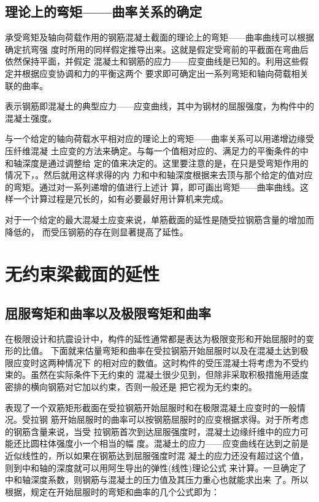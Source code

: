 \documentclass[12pt,a4paper]{book}
\begin{document}
\subsection{理论上的弯矩——曲率关系的确定}

承受弯矩及轴向荷载作用的钢筋混凝土截面的理论上的弯矩——曲率曲线可以根据确定抗弯强
度时所用的同样假定推导出来。这就是假定受弯前的平截面在弯曲后依然保持平面，并假定
混凝土和钢筋的应力——应变曲线是已知的。利用这些假定并根据应变协调和力的平衡这两个
要求即可确定出一系列弯矩和轴向荷载相关联的曲率。

表示钢筋即混凝土的典型应力——应变曲线，其中为钢材的屈服强度，为构件中的混凝土强度。

与一个给定的轴向荷载水平相对应的理论上的弯矩——曲率关系可以用递增边缘受压纤维混凝
土应变的方法来确定。与每一个值相对应的、满足力的平衡条件的中和轴深度是通过调整给
定的值来决定的。这里要注意的是，在只是受弯矩作用的情况下，。然后就用这样求得的内
力和中和轴深度根据来去顶与那个给定的值对应的弯矩。通过对一系列递增的值进行上述计
算，即可画出弯矩——曲率曲线。这样一个计算过程是冗长的，如有必要最好用计算机来完成。

对于一个给定的最大混凝土应变来说，单筋截面的延性是随受拉钢筋含量的增加而降低的，
而受压钢筋的存在则显著提高了延性。

\section{无约束梁截面的延性}

\subsection{屈服弯矩和曲率以及极限弯矩和曲率}

在极限设计和抗震设计中，构件的延性通常都是表达为极限变形和开始屈服时的变形的比值。
下面就来估量弯矩和曲率在受拉钢筋开始屈服时以及在混凝土达到极限应变时这两种情况下
的相对应的数值。这时构件的受压混凝土将考虑为不受约束的。虽然在实际条件下无约束的
混凝土很少见到，但除非采取积极措施用适度密排的横向钢筋对它加以约束，否则一般还是
把它视为无约束的。

表现了一个双筋矩形截面在受拉钢筋开始屈服时和在极限混凝土应变时的一般情况。受拉钢
筋开始屈服时的曲率可以按钢筋屈服时的应变根据求得。对于所考虑的钢筋含量来说，当受
拉钢筋首次到达屈服强度时，混凝土边缘纤维中的应力可能还比圆柱体强度小一个相当的幅
度。混凝土的应力——应变曲线在达到之前是近似线性的，所以如果在钢筋达到屈服强度时混
凝土的应力还没有超过这个值，则到中和轴的深度就可以用阿生导出的弹性(线性)理论公式
来计算。一旦确定了中和轴深度系数，则钢筋与混凝土的压力值及其压力重心也就能求出来
了。所以根据，规定在开始屈服时的弯矩和曲率的几个公式即为：
\end{document}
